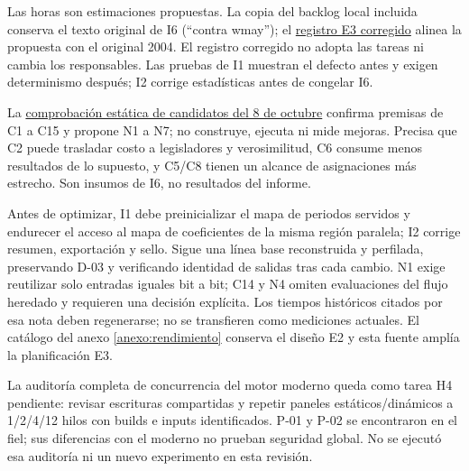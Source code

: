 Las horas son estimaciones propuestas. La copia del backlog local incluida conserva el texto
original de I6 (``contra wmay''); el \href{run:../evidence/ETAPA-3-consistency-proposal-2026-10-08.md}{registro E3 corregido}
alinea la propuesta con el original 2004.
El registro corregido no adopta las tareas ni cambia los responsables. Las pruebas de I1 muestran
el defecto antes y exigen determinismo después; I2 corrige estadísticas antes de congelar I6.

La \href{run:../evidence/performance-candidates-confirmed-2026-10-08.md}{comprobación estática
de candidatos del 8 de octubre} confirma premisas de C1 a C15 y propone N1 a N7; no construye,
ejecuta ni mide mejoras. Precisa que C2 puede trasladar costo a legisladores y verosimilitud,
C6 consume menos resultados de lo supuesto, y C5/C8 tienen un alcance de asignaciones más
estrecho. Son insumos de I6, no resultados del informe.

Antes de optimizar, I1 debe preinicializar el mapa de periodos servidos y endurecer el acceso
al mapa de coeficientes de la misma región paralela; I2 corrige resumen, exportación y sello. Sigue una
línea base reconstruida y perfilada, preservando D-03 y verificando identidad de salidas tras
cada cambio. N1 exige reutilizar solo entradas iguales bit a bit; C14 y N4 omiten evaluaciones
del flujo heredado y requieren una decisión explícita. Los tiempos históricos citados por esa
nota deben regenerarse; no se transfieren como mediciones actuales. El catálogo del anexo
\ref{anexo:rendimiento} conserva el diseño E2 y esta fuente amplía la planificación E3.

La auditoría completa de concurrencia del motor moderno queda como tarea H4 pendiente: revisar
escrituras compartidas y repetir paneles estáticos/dinámicos a 1/2/4/12 hilos con builds e inputs
identificados. P-01 y P-02 se encontraron en el fiel; sus diferencias con el moderno no prueban
seguridad global. No se ejecutó esa auditoría ni un nuevo experimento en esta revisión.
